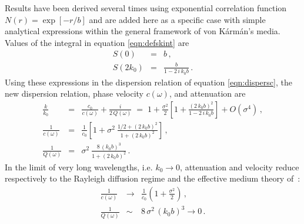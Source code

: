 Results have been derived several times \cite[]{Karal_K64,Sato_F98} 
using exponential correlation function
$N(r)=\exp[-r/b]$ and are added here as a specific case
with simple analytical expressions within the general framework of von K\'arm\'an's media.
Values of the integral in equation \ref{eqn:defskint} are
\begin{eqnarray}
S(0) & = & b\,,\\
S(2k_0) & = & \frac{b}{1-2\,i\,k_0b}\,.
\end{eqnarray}
Using these expressions in the dispersion relation of equation \ref{eqn:dispersc}, the new dispersion relation, phase velocity $c(\omega)$, and attenuation are
\begin{eqnarray}
\frac{k}{k_0} & = & \frac{c_0}{c(\omega)} + \frac{i}{2\,Q(\omega)} \; = \; 1 + \frac{\sigma^2}{2}\left[1 + \frac{(2\,k_0b)^2}{1-2\,i\,k_0b}\right] + O(\sigma^4)\,,  \\
\frac{1}{c(\omega)} & = & \frac{1}{c_0}
\left[1+\sigma^2~\frac{1/2+(2\,k_0b)^2}{1+(2\,k_0b)^2}\right]\,, \label{eqn:vdispe1} \\
\frac{1}{Q(\omega)} & = & \sigma^2~\frac{8\,(k_0b)^3}{1+(2\,k_0b)^2}\,. \label{eqn:vqe1}
\end{eqnarray}
In the limit of very long wavelengths, i.e. $k_0\rightarrow 0$,
attenuation and velocity reduce respectively to the Rayleigh diffusion
regime and the effective medium theory of \cite{Backus_62}\,:
\begin{eqnarray}
\frac{1}{c(\omega)} & \rightarrow & \frac{1}{c_0}\left(1+\frac{\sigma^2}{2}\right)\,,\\
\frac{1}{Q(\omega)} & \sim & 8\,\sigma^2\,(k_0b)^3 \rightarrow 0\,.
\end{eqnarray}




%
